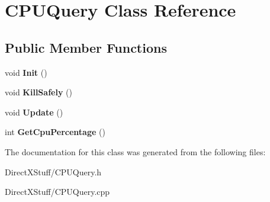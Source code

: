 \hypertarget{class_c_p_u_query}{\section{C\-P\-U\-Query Class Reference}
\label{class_c_p_u_query}
}
\subsection*{Public Member Functions}
\begin{DoxyCompactItemize}
\item 
\hypertarget{class_c_p_u_query_a186576f4d5923d7bf6b91c8c5a2d2edb}{void {\bfseries Init} ()}\label{class_c_p_u_query_a186576f4d5923d7bf6b91c8c5a2d2edb}

\item 
\hypertarget{class_c_p_u_query_a909fa445afc541b51fdc3b8b3719485e}{void {\bfseries Kill\-Safely} ()}\label{class_c_p_u_query_a909fa445afc541b51fdc3b8b3719485e}

\item 
\hypertarget{class_c_p_u_query_a9a3cb2231fced473df727d4df429b8a3}{void {\bfseries Update} ()}\label{class_c_p_u_query_a9a3cb2231fced473df727d4df429b8a3}

\item 
\hypertarget{class_c_p_u_query_a55dd2e56afc28a0e503ef2282ee1f82a}{int {\bfseries Get\-Cpu\-Percentage} ()}\label{class_c_p_u_query_a55dd2e56afc28a0e503ef2282ee1f82a}

\end{DoxyCompactItemize}


The documentation for this class was generated from the following files\-:\begin{DoxyCompactItemize}
\item 
Direct\-X\-Stuff/C\-P\-U\-Query.\-h\item 
Direct\-X\-Stuff/C\-P\-U\-Query.\-cpp\end{DoxyCompactItemize}
